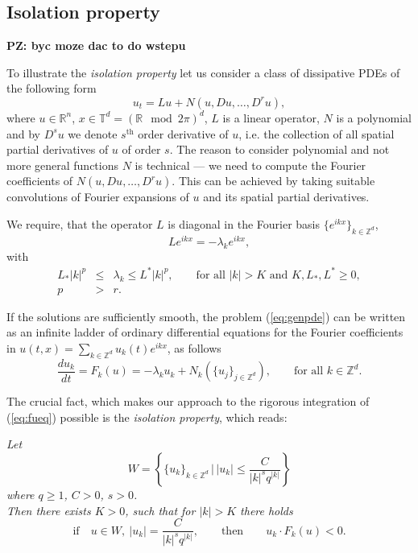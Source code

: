 
\subsection{Isolation property}

\textbf{PZ: byc moze dac to do wstepu}


To illustrate the \emph{isolation property}
let us consider a class of dissipative PDEs of the following form
\begin{equation}
  u_t = L u + N\left(u,Du,\dots,D^ru\right), \label{eq:genpde}
\end{equation}
where $u \in \mathbb{R}^n$,  $x \in \mathbb{T}^d=\left(\mathbb{R}\mod 2\pi\right)^d$, $L$ is a linear operator, $N$ is a
polynomial and by $D^s u$ we denote $s^{\text{th}}$ order derivative of
$u$, i.e. the collection of all spatial partial derivatives of $u$ of
order $s$. The reason to consider polynomial and not more general functions $N$ is technical --- we need to compute
the Fourier coefficients of $N\left(u,Du,\dots,D^ru\right)$. This can be achieved by taking suitable convolutions of Fourier expansions of $u$ and its spatial partial derivatives.

We require, that the operator $L$ is diagonal in the Fourier basis
$\{e^{ikx}\}_{k \in \mathbb{Z}^d}$,
\begin{equation*}
  L e^{ikx}= -\lambda_k e^{ikx},
\end{equation*}
with
\begin{eqnarray*}
 L_* |k|^p &\leq& \lambda_k \leq  L^* |k|^p, \qquad \text{for all $|k| > K$ and  $K,L_*,L^* \geq 0$}, \\
    p &>& r.
\end{eqnarray*}

If the solutions are sufficiently smooth, the problem (\ref{eq:genpde}) can be written as an infinite ladder of ordinary differential equations for the Fourier
coefficients in $u(t,x)=\sum_{k \in \mathbb{Z}^d} u_k(t) e^{i kx}$, as follows
\begin{equation}
  \frac{d u_k}{dt} = F_k(u)=-\lambda_k u_k + N_k\left(\{u_j\}_{j \in \mathbb{Z}^d}\right), \qquad \mbox{for all
  $k \in \mathbb{Z}^d$}. \label{eq:fueq}
\end{equation}



The crucial fact, which makes our approach to the rigorous integration of (\ref{eq:fueq})  possible is the \emph{isolation property}, which reads:

\emph{Let}
\begin{equation*}
   W=\left\{ \{u_k\}_{k \in \mathbb{Z}^d}\,|\,  |u_k| \leq \frac{C}{|k|^s q^{|k|}}\right\}
\end{equation*}
\emph{where $q\geq 1$, $C>0$, $s>0$. \\
Then there  exists $K>0$, such that for $|k| > K$ there holds}
\begin{equation*}
 \mbox{if} \quad u \in W, \ |u_k|=\frac{C}{|k|^s q^{|k|}}, \qquad \mbox{then} \qquad  u_k \cdot F_k(u) <0.
\end{equation*}

